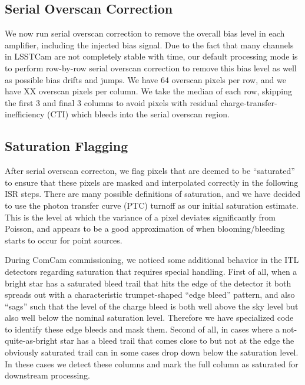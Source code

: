 \documentclass[SE,authoryear,lsstdraft,toc]{lsstdoc}
\begin{document}
\subsection{Serial Overscan Correction}
\label{sec:serialoverscancorr}

We now run serial overscan correction to remove the overall bias level in each amplifier, including the injected bias signal.
Due to the fact that many channels in LSSTCam are not completely stable with time, our default processing mode is to perform row-by-row serial overscan correction to remove this bias level as well as possible bias drifts and jumps.
We have 64 overscan pixels per row, and we have XX overscan pixels per column.
We take the median of each row, skipping the first 3 and final 3 columns to avoid pixels with residual charge-transfer-inefficiency (CTI) which bleeds into the serial overscan region.

\subsection{Saturation Flagging}
\label{sec:satflagging}

After serial overscan correcton, we flag pixels that are deemed to be ``saturated'' to ensure that these pixels are masked and interpolated correctly in the following ISR steps.
There are many possible definitions of saturation, and we have decided to use the photon transfer curve (PTC) turnoff as our initial saturation estimate.
This is the level at which the variance of a pixel deviates significantly from Poisson, and appears to be a good approximation of when blooming/bleeding starts to occur for point sources.

During ComCam commissioning, we noticed some additional behavior in the ITL detectors regarding saturation that requires special handling.
First of all, when a bright star has a saturated bleed trail that hits the edge of the detector it both spreads out with a characteristic trumpet-shaped ``edge bleed'' pattern, and also ``sags'' such that the level of the charge bleed is both well above the sky level but also well below the nominal saturation level.
Therefore we have specialized code to identify these edge bleeds and mask them.
Second of all, in cases where a not-quite-as-bright star has a bleed trail that comes close to but not at the edge the obviously saturated trail can in some cases drop down below the saturation level.
In these cases we detect these columns and mark the full column as saturated for downstream processing.
\end{document}
